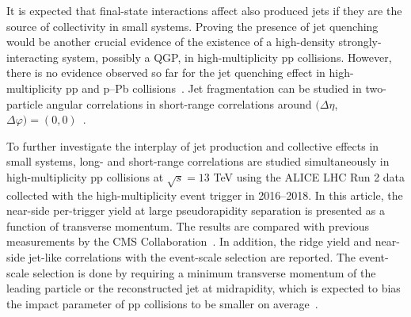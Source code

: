 It is expected that final-state interactions affect also produced jets if they are the source of collectivity in small systems. Proving the presence of jet quenching~\cite{Gyulassy:1990ye,Wang:1991xy} would be another crucial evidence of the existence of a high-density strongly-interacting system, possibly a QGP, in high-multiplicity pp collisions. However, there is no evidence observed so far for the jet quenching effect in high-multiplicity pp and p--Pb collisions~\cite{Khachatryan:2016odn,Adam:2016jfp,Adam:2016dau,Acharya:2017okq}. Jet fragmentation can be studied in two-particle angular correlations in short-range correlations around $(\Delta\eta$, $\Delta\varphi)=(0,0)$~\cite{Adam:2016tsv}.  



% 

To further investigate the interplay of jet production and collective effects in small systems, long- and short-range correlations are studied simultaneously in high-multiplicity pp collisions at $\sqrt{s} =13$ TeV using the ALICE LHC Run 2 data collected with the high-multiplicity event trigger in 2016--2018. In this article, the near-side per-trigger yield at large pseudorapidity separation is presented as a function of transverse momentum. The results are compared with previous measurements by the CMS Collaboration~\cite{Khachatryan:2015lva}. %
In addition, the ridge yield and near-side jet-like correlations with the event-scale selection are reported. The event-scale selection is done by requiring a minimum transverse momentum of the leading particle or the reconstructed jet at midrapidity, which is expected to bias the impact parameter of pp collisions to be smaller on average~\cite{Sjostrand:1986ep,Frankfurt:2010ea}.

